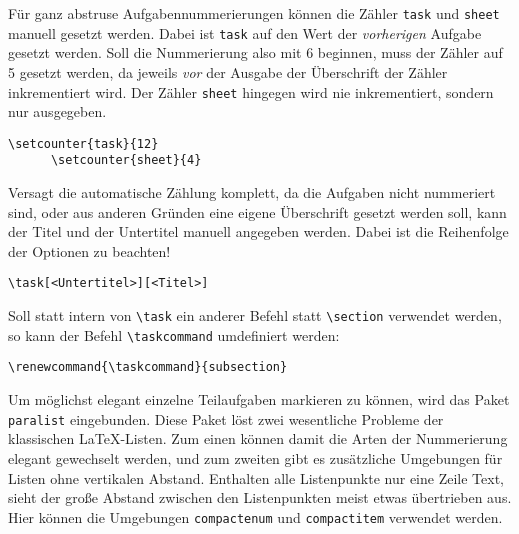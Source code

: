 \documentclass{exercise}
\begin{document}
    Für ganz abstruse Aufgabennummerierungen können die Zähler \lstinline{task} und \lstinline{sheet} manuell gesetzt werden. Dabei ist \lstinline{task} auf den Wert der \emph{vorherigen} Aufgabe gesetzt werden. Soll die Nummerierung also mit 6 beginnen, muss der Zähler auf 5 gesetzt werden, da jeweils \emph{vor} der Ausgabe der Überschrift der Zähler inkrementiert wird. Der Zähler \lstinline{sheet} hingegen wird nie inkrementiert, sondern nur ausgegeben.
    \begin{lstlisting}[gobble=6]
      \setcounter{task}{12}
      \setcounter{sheet}{4}
    \end{lstlisting}

    Versagt die automatische Zählung komplett, da die Aufgaben nicht nummeriert sind, oder aus anderen Gründen eine eigene Überschrift gesetzt werden soll, kann der Titel und der Untertitel manuell angegeben werden. Dabei ist die Reihenfolge der Optionen zu beachten!
    \begin{lstlisting}[gobble=6]
      \task[<Untertitel>][<Titel>]
    \end{lstlisting}
    
    Soll statt intern von \lstinline-\task- ein anderer Befehl statt \lstinline-\section- verwendet werden, so kann der Befehl \lstinline-\taskcommand- umdefiniert werden:
    \begin{lstlisting}[gobble=6]
      \renewcommand{\taskcommand}{subsection}
    \end{lstlisting}
  
    Um möglichst elegant einzelne Teilaufgaben markieren zu können, wird das Paket \texttt{paralist} \cite{paralist} eingebunden. Diese Paket löst zwei wesentliche Probleme der klassischen \LaTeX{}-Listen. Zum einen können damit die Arten der Nummerierung elegant gewechselt werden, und zum zweiten gibt es zusätzliche Umgebungen für Listen ohne vertikalen Abstand. Enthalten alle Listenpunkte nur eine Zeile Text, sieht der große Abstand zwischen den Listenpunkten meist etwas übertrieben aus. Hier können die Umgebungen \lstinline{compactenum} und \lstinline{compactitem} verwendet werden.
    
\end{document}

